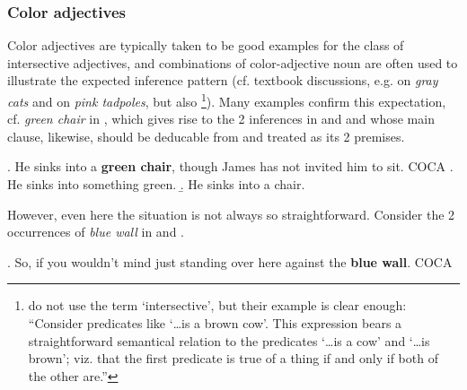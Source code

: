\subsubsection{Color adjectives}
\label{sec:color_adjectives}

 
Color adjectives are typically taken to be good examples for the class
of intersective adjectives, and combinations of color-adjective noun
are often used to illustrate the expected inference pattern
(cf. textbook discussions, e.g. \citealt[62--70]{HeimandKratzer:1998}
on \emph{gray cats} and \citealt[459--461]{Chierchiaetal:2000} on
\emph{pink tadpoles}, but also
\citealt[43]{FodorandPylyshyn:1988}\footnote{\citet[43]{FodorandPylyshyn:1988}
  do not use the term `intersective', but their example is clear
  enough: ``Consider predicates like `\dots is a brown cow'. This
  expression bears a straightforward semantical relation to the
  predicates `\dots is a cow' and `\dots is brown'; viz. that the
  first predicate is true of a thing if and only if both of the other
  are.''}). Many examples confirm this expectation, cf. \emph{green
  chair} in \Next, which gives rise to the 2 inferences in \Next[a]
and \Next[b] and whose main clause, likewise, should be deducable from
\Next[a] and \Next[b] treated as its 2 premises.

\ex. \label{ex:green_chair}
He sinks into a \textbf{green chair}, though James has not invited him to sit. COCA
\a. He sinks into something green.
\b. He sinks into a chair.

However, even here the situation is not always so
straightforward. Consider the 2 occurrences of \emph{blue
  wall} in \Next and \NNext.

\ex. \label{ex:blue_wall}
So, if you wouldn't mind just standing over here against the \textbf{blue
wall}. COCA 

